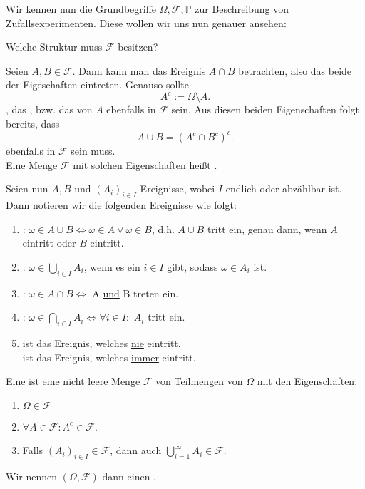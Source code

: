 Wir kennen nun die Grundbegriffe $\Omega, \mathcal{F}, \mathbb{P}$ zur Beschreibung von Zufallsexperimenten. Diese wollen wir uns nun genauer ansehen:
\begin{question}
    Welche Struktur muss $\mathcal{F}$ besitzen?
\end{question}
Seien $A,B\in \mathcal{F}$. Dann kann man das Ereignis $A \cap B$ betrachten, also das beide der Eigeschaften eintreten. Genauso sollte
 \[
A^{c} := \Omega \setminus A 
.\] 
, das , bzw. das  von $A$ ebenfalls in  $\mathcal{F}$  sein. Aus diesen beiden Eigenschaften folgt bereits, dass
\[
    A \cup B= (A^{c} \cap B^{c})^{c}
.\] 
ebenfalls in $\mathcal{F}$ sein muss. \\
Eine Menge $\mathcal{F}$ mit solchen Eigenschaften heißt .
\begin{dnotation}
Seien nun $A,B$ und $(A_i)_{i\in I}$  Ereignisse, wobei $I$ endlich oder abzählbar ist. Dann notieren wir die folgenden Ereignisse wie folgt:
\begin{enumerate}[label=\protect\circled{\alph*}]
    \item {} : $ω\in A \cup B \iff  ω\in A \lor ω\in B$, d.h. $A\cup B$ tritt ein, genau dann, wenn  $A$ eintritt oder  $B$ eintritt.
        \item  {}: $ω\in \bigcup_{i \in  I} A_i$, wenn es ein $i\in I$ gibt, sodass $\omega \in A_i$ ist.
    \item  {}: $\omega\in A \cap B \iff  $ A \underline{und} B treten ein.
        \item {}: $\omega\in \bigcap_{i \in I}A_i \iff \forall i \in I \colon$ $A_i$ tritt ein.
            \item {} ist das Ereignis, welches  \underline{nie} eintritt. \\
                 ist das Ereignis, welches \underline{immer} eintritt.
\end{enumerate}
\end{dnotation}

\begin{definition}\label{def:sigma-algebra}
    Eine   ist eine nicht leere Menge $\mathcal{F}$ von Teilmengen von $\Omega$ mit den Eigenschaften:
    \begin{enumerate}[label=\protect\circled{\alph*}]
        \item $\Omega \in \mathcal{F}$
        \item $\forall A\in \mathcal{F} \colon A^{c}\in \mathcal{F}$.
        \item Falls $(A_i)_{i \in I}\in \mathcal{F}$, dann auch $\bigcup_{i=1} ^{\infty}A_i \in \mathcal{F}$.
    \end{enumerate}
    Wir nennen $(\Omega,\mathcal{F})$ dann einen . 
\end{definition}

